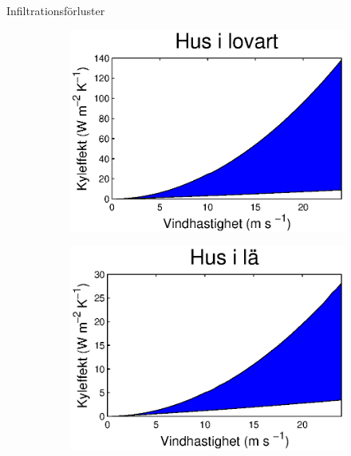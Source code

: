 \begin{frame}{Infiltrationsförluster}

\begin{figure}[hpbt]
\begin{subfigure}{0.45\textwidth}
\centering
	\includegraphics[scale=0.53]{images/pressurewind.eps}
\end{subfigure}\hfill
\begin{subfigure}{0.45\textwidth}
\centering
	\includegraphics[scale=0.53]{images/pressurenowind.eps}
\end{subfigure}
\end{figure}

\end{frame}
